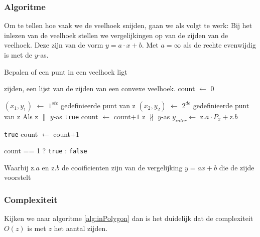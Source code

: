 \subsubsection{Algoritme}
Om te tellen hoe vaak we de veelhoek snijden, gaan we als volgt te werk:
Bij het inlezen van de veelhoek stellen we vergelijkingen op van de zijden van de
veelhoek. Deze zijn van de vorm $y=a \cdot x+b$. Met $a = \infty$ als de rechte evenwijdig is met de $y$-as.



	\begin{algorithm}[H]
	 	\caption{Bepalen of een punt in een veelhoek ligt}
		\begin{algorithmic}
		\Require zijden, een lijst van de zijden van een convexe veelhoek.
		\State count $\gets$ 0

		\State $(x_1,y_1)$ $\gets$ $1^{ste}$ gedefinieerde punt van z
		\State $(x_2,y_2)$ $\gets$ $2^{de}$ gedefinieerde punt van z
		 	\Comment Als z $\parallel$ $y$-as
			\State \Return \texttt{true} 
				\State count $\gets$ count$+1$
			\EndIf
		\Else	\Comment z $\not \parallel$ $y$-as
			\State $y_{inter}  \gets$ z.$a\cdot P_x +$z.$b$

				\State \Return \texttt{true} 
				\State count $\gets$ count$+1$
			\EndIf

			\EndIf
		\EndIf

		\EndFor

		\Return count == 1 ? \texttt{true} : \texttt{false}
		\EndFunction
		\end{algorithmic}
		\label{alg:inPolygon}
	\end{algorithm}

Waarbij z$.a$ en z$.b$ de cooificienten zijn van de vergelijking $y=ax+b$ die de zijde
voorstelt

\subsubsection{Complexiteit}
Kijken we naar algoritme \ref{alg:inPolygon} dan is het duidelijk dat de complexiteit $O(z)$ is met $z$ het aantal zijden.



